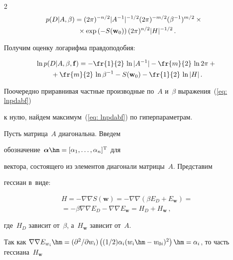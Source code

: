 \begin{multicols}{2}
\begin{multline*}

\hspace*{-2.5mm}p(D|A,\beta)=(2\pi)^{-{n}/{2}}|A^{-1}|^{-{1}/{2}}(2\pi)^{-{m}/{2}}(\beta^{-1})^{{m}/{2}} \times{}\\

{}\times

\exp\left(-S(\mathbf{w}_0)\right)(2\pi)^{{n}/{2}}|H|^{-{1}/{2}}\,.

\end{multline*}

Получим оценку логарифма правдоподобия:

\begin{multline}

\label {eq: lnpdabf}

\ln p(D|A,\beta,\mathbf{f})=-\fr{1}{2}\,\ln|A^{-1}|-\fr{m}{2}\,\ln 2\pi + {}\\

{}+

\fr{m}{2}\,\ln\beta^{-1}-S(\mathbf{w}_0)-\fr{1}{2}\,\ln|H|\,.

\end{multline}

Поочередно приравнивая частные производные по~$A$ и~$\beta$ выражения~(\ref{eq: lnpdabf}) 

к нулю, найдем максимум~(\ref{eq: lnpdabf}) по гиперпараметрам.



Пусть матрица~$A$ диагональна. Введем

обозначение~$\boldsymbol{\alpha}\hm=[\alpha_1, \ldots ,\alpha_n]^{\mathrm{T}}$ для

вектора, состоящего из элементов диагонали матрицы~$A$. Представим

гессиан в~виде:

\begin{multline*}

H=- \nabla \nabla S(\mathbf{w})=-\nabla\nabla\left(\beta E_D + E_\mathbf{w}\right)={}\\

{}=

-\beta\nabla\nabla E_D-\nabla\nabla E_\mathbf{w}=H_D+H_{\mathbf{w}}\,,

\end{multline*}

где~$H_D$ зависит от~$\beta$, а~$H_\mathbf{w}$ зависит от~$A$.

Так как $\nabla\nabla E_{w_i}\hm=({\partial^2}/{\partial w_i}) 

\left((1/2)\alpha_i (w_i\hm-w_{0i})^2\right)\hm=\alpha_i$, то часть гессиана~$H_\mathbf{w}$ 


\end{multicols}

